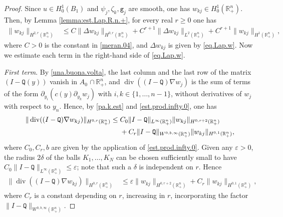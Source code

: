 \documentclass[10pt,a4paper]{amsart}
\newcommand{\R}{{\mathbb R}}
\DeclareMathOperator{\divergence}{div}
\newcommand{\e}{\varepsilon}
\newcommand{\grad}{\nabla}
\newcommand{\pa}{\partial}
\begin{document}
\begin{proof}
Since $u \in H^1_0(B_1)$ and $\psi_j, \zeta_k, \mathtt g_j$ are smooth, 
one has $w_{kj} \in H^1_0(\R^n_+)$. 
Then, by Lemma \ref{lemma:est.Lap.R.n.+}, for every real $r \geq 0$ one has 
\begin{align} 
\| w_{kj} \|_{H^{2,r}(\R^n_+)} 
& \leq C \| \Delta w_{kj} \|_{H^{0,r}(\R^n_+)} 
+ C^{r+1} \| \Delta w_{kj} \|_{L^2(\R^n_+)} 
+ C^{r+1} \| w_{kj} \|_{H^1(\R^n_+)}, 
\label{olive.01}
\end{align}
where $C > 0$ is the constant in \eqref{meran.04},
and $\Delta w_{kj}$ is given by \eqref{eq.Lap.w}. 
Now we estimate each term in the right-hand side of \eqref{eq.Lap.w}. 

\emph{First term}. 
By \eqref{una.buona.volta}, the last column and the last row 
of the matrix $(I - \mathtt Q(y))$ vanish in $A_0$ $\cap \, \R^n_+$,
and $\divergence ((I - \mathtt Q) \grad w_j)$ 
is the sum of terms of the form $\pa_{y_i} ( c(y) \pa_{y_k} w_j)$ 
with $i, k \in \{ 1, \ldots, n-1 \}$, without derivatives of $w_j$ with respect to $y_n$. 
Hence, by \eqref{pa.k.est} and \eqref{est.prod.infty.0}, one has 
\begin{align*}
\| \divergence ((I - \mathtt Q) \grad w_{kj}) \|_{H^{0,r}(\R^n_+)} 
& \leq C_0 \| I - \mathtt Q \|_{L^\infty(\R^n_+)} \| w_{kj} \|_{H^{0,r+2}(\R^n_+)}
\notag \\ & \quad \ 
+ C_r \| I - \mathtt Q \|_{W^{0,b,\infty}(\R^n_+)} \| w_{kj} \|_{H^{0,1}(\R^n_+)},
\end{align*}
where $C_0, C_r, b$ are given by the application of \eqref{est.prod.infty.0}. 
Given any $\e > 0$, the radius $2\delta$ of the balls $K_1, \ldots, K_N$ 
can be chosen sufficiently small to have 
$C_0 \| I - \mathtt Q \|_{L^\infty(\R^n_+)} \leq \e$; 
note that such a $\delta$ is independent on $r$. 
Hence 
\begin{align}  \label{olive.02}
\| \divergence ((I - \mathtt Q) \grad w_{kj}) \|_{H^{0,r}(\R^n_+)} 
& \leq \e \| w_{kj} \|_{H^{0,r+2}(\R^n_+)} 
+ C_r \| w_{kj} \|_{H^{0,1}(\R^n_+)},
\end{align} 
where $C_r$ is a constant depending on $r$, increasing in $r$, 
incorporating the factor $\| I - \mathtt Q \|_{W^{0,b,\infty}(\R^n_+)}$. 


\end{proof}
\end{document}
